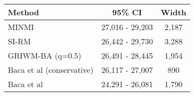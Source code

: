 
\begin{tabular}{lcc}
\toprule
Method & 95\% CI & Width\\
\midrule
MINMI & 27,016 - 29,203 & 2,187\\
SI-RM & 26,442 - 29,730 & 3,288\\
GRIWM-BA (q=0.5) & 26,491 - 28,445 & 1,954\\
Baca et al (conservative) & 26,117 - 27,007 & 890\\
Baca et al & 24,291 - 26,081 & 1,790\\
\bottomrule
\end{tabular}
